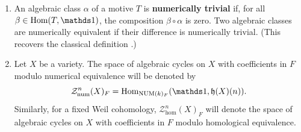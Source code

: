 \begin{enumerate}
\item An algebraic class $\alpha$ of a motive $T$ is \textbf{numerically trivial} if, for all $\beta\in\Hom(T,\one)$, the composition
$\beta \circ \alpha $  is zero. Two algebraic classes are numerically equivalent if their difference is numerically trivial. (This recovers the classical definition \cite[7.1.2]{AK}.)

\item Let $X$ be a variety. The space of algebraic cycles on $X$ with coefficients in $F$ modulo numerical equivalence will be denoted by \[\mathcal{Z}^{n}_{\num}(X)_{F}= \Hom_{\NUM(k)_F}(\one, \mathfrak{h}(X)(n)).\]
Similarly, for a fixed Weil cohomology, $\mathcal{Z}^{n}_{\hom}(X)_{F}$ will denote the space of algebraic cycles on $X$ with coefficients in $F$ modulo homological equivalence.



\end{enumerate}
